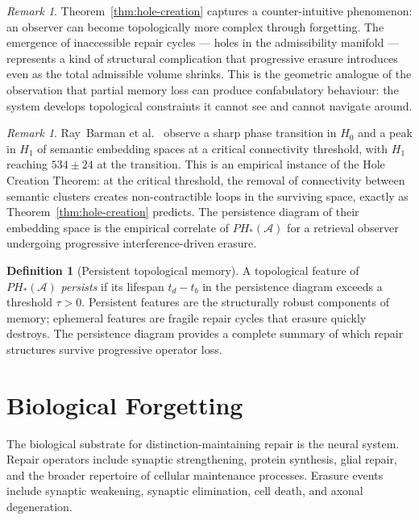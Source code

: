 \documentclass[12pt, oneside]{article}
\theoremstyle{plain}
\theoremstyle{definition}
\newtheorem{definition}[theorem]{Definition}
\theoremstyle{remark}
\newtheorem{remark}[theorem]{Remark}
\newcommand{\AO}{\mathcal{A}}
\begin{document}
\begin{remark}
  Theorem~\ref{thm:hole-creation} captures a counter-intuitive
  phenomenon: an observer can become topologically more complex
  through forgetting.
  The emergence of inaccessible repair cycles --- holes in the
  admissibility manifold --- represents a kind of structural
  complication that progressive erasure introduces even as the
  total admissible volume shrinks.
  This is the geometric analogue of the observation that partial
  memory loss can produce confabulatory behaviour: the system
  develops topological constraints it cannot see and cannot
  navigate around.
\end{remark}

\begin{remark}
  Ray~Barman et al.~\cite{RayBarman2026} observe a sharp phase
  transition in $H_0$ and a peak in $H_1$ of semantic embedding
  spaces at a critical connectivity threshold, with $H_1$ reaching
  $534 \pm 24$ at the transition.
  This is an empirical instance of the Hole Creation Theorem:
  at the critical threshold, the removal of connectivity between
  semantic clusters creates non-contractible loops in the surviving
  space, exactly as Theorem~\ref{thm:hole-creation} predicts.
  The persistence diagram of their embedding space is the empirical
  correlate of $PH_*(\AO)$ for a retrieval observer undergoing
  progressive interference-driven erasure.
\end{remark}

\begin{definition}[Persistent topological memory]
  A topological feature of $PH_*(\AO)$ \emph{persists} if its
  lifespan $t_d - t_b$ in the persistence diagram exceeds a
  threshold $\tau > 0$.
  Persistent features are the structurally robust components of
  memory; ephemeral features are fragile repair cycles that erasure
  quickly destroys.
  The persistence diagram provides a complete summary of which
  repair structures survive progressive operator loss.
\end{definition}


\section{Biological Forgetting}
\label{sec:bio}

The biological substrate for distinction-maintaining repair is
the neural system.
Repair operators include synaptic strengthening, protein synthesis,
glial repair, and the broader repertoire of cellular maintenance
processes.
Erasure events include synaptic weakening, synaptic elimination,
cell death, and axonal degeneration.
\end{document}
